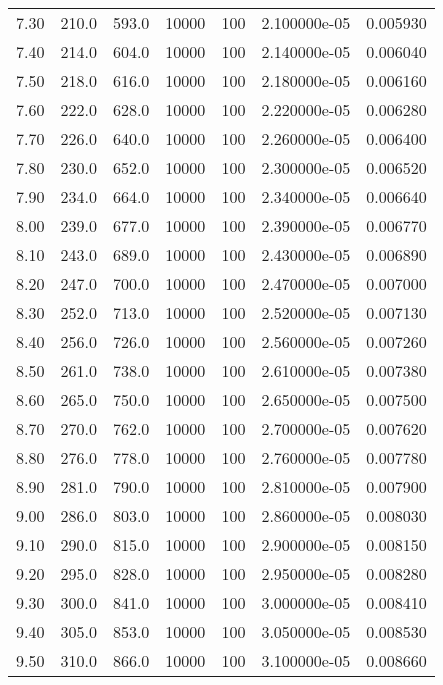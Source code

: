 \begin{tabular}{rrrrrrr}
    7.30 &     210.0 &     593.0 & 10000 &  100 & 2.100000e-05 & 0.005930 \\
    7.40 &     214.0 &     604.0 & 10000 &  100 & 2.140000e-05 & 0.006040 \\
    7.50 &     218.0 &     616.0 & 10000 &  100 & 2.180000e-05 & 0.006160 \\
    7.60 &     222.0 &     628.0 & 10000 &  100 & 2.220000e-05 & 0.006280 \\
    7.70 &     226.0 &     640.0 & 10000 &  100 & 2.260000e-05 & 0.006400 \\
    7.80 &     230.0 &     652.0 & 10000 &  100 & 2.300000e-05 & 0.006520 \\
    7.90 &     234.0 &     664.0 & 10000 &  100 & 2.340000e-05 & 0.006640 \\
    8.00 &     239.0 &     677.0 & 10000 &  100 & 2.390000e-05 & 0.006770 \\
    8.10 &     243.0 &     689.0 & 10000 &  100 & 2.430000e-05 & 0.006890 \\
    8.20 &     247.0 &     700.0 & 10000 &  100 & 2.470000e-05 & 0.007000 \\
    8.30 &     252.0 &     713.0 & 10000 &  100 & 2.520000e-05 & 0.007130 \\
    8.40 &     256.0 &     726.0 & 10000 &  100 & 2.560000e-05 & 0.007260 \\
    8.50 &     261.0 &     738.0 & 10000 &  100 & 2.610000e-05 & 0.007380 \\
    8.60 &     265.0 &     750.0 & 10000 &  100 & 2.650000e-05 & 0.007500 \\
    8.70 &     270.0 &     762.0 & 10000 &  100 & 2.700000e-05 & 0.007620 \\
    8.80 &     276.0 &     778.0 & 10000 &  100 & 2.760000e-05 & 0.007780 \\
    8.90 &     281.0 &     790.0 & 10000 &  100 & 2.810000e-05 & 0.007900 \\
    9.00 &     286.0 &     803.0 & 10000 &  100 & 2.860000e-05 & 0.008030 \\
    9.10 &     290.0 &     815.0 & 10000 &  100 & 2.900000e-05 & 0.008150 \\
    9.20 &     295.0 &     828.0 & 10000 &  100 & 2.950000e-05 & 0.008280 \\
    9.30 &     300.0 &     841.0 & 10000 &  100 & 3.000000e-05 & 0.008410 \\
    9.40 &     305.0 &     853.0 & 10000 &  100 & 3.050000e-05 & 0.008530 \\
    9.50 &     310.0 &     866.0 & 10000 &  100 & 3.100000e-05 & 0.008660 \\

\end{tabular}
